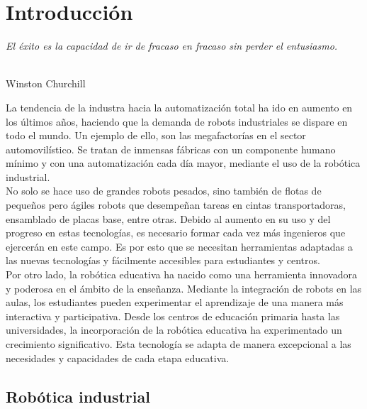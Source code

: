 \chapter{Introducción}
\label{cap:capitulo1}
\setcounter{page}{1}

\begin{flushright}
\begin{minipage}[]{10cm}
\emph{El éxito es la capacidad de ir de fracaso en fracaso sin perder el entusiasmo.}\\
\end{minipage}\\

Winston Churchill\\
\end{flushright}

\vspace{1cm}

La tendencia de la industra hacia la automatización total ha ido en aumento en los últimos años, 
haciendo que la demanda de robots industriales se dispare en todo el mundo. Un ejemplo de ello, son 
las megafactorías en el sector automovilístico. Se tratan de inmensas fábricas con un componente humano
mínimo y con una automatización cada día mayor, mediante el uso de la robótica industrial. \\No solo se hace
uso de grandes robots pesados, sino también de flotas de pequeños pero ágiles robots que desempeñan tareas
en cintas transportadoras, ensamblado de placas base, entre otras.  Debido al aumento en su uso y del progreso 
en estas tecnologías, es necesario formar cada vez más ingenieros que ejercerán en este campo. Es por esto que se 
necesitan herramientas adaptadas a las nuevas tecnologías y fácilmente accesibles para estudiantes y centros.    \\
Por otro lado, la robótica educativa ha nacido como una herramienta innovadora y poderosa en el ámbito de la 
enseñanza. Mediante la integración de robots en las aulas, los estudiantes pueden experimentar el 
aprendizaje de una manera más interactiva y participativa. Desde los centros de educación primaria hasta las 
universidades, la incorporación de la robótica educativa ha experimentado un crecimiento significativo. Esta 
tecnología se adapta de manera excepcional a las necesidades y capacidades de cada etapa educativa.

\section{Robótica industrial}
\label{sec:miseccion} %


